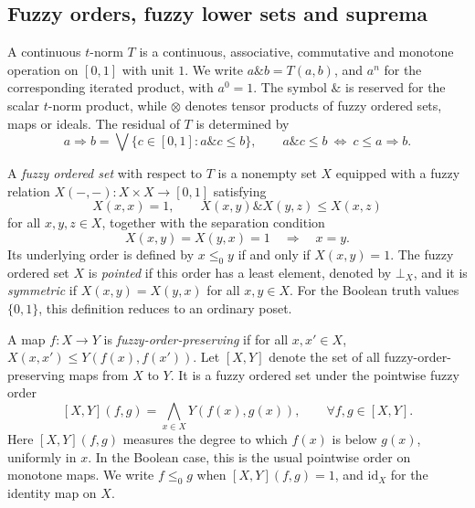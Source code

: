 \documentclass[preprint,3p,times]{elsarticle}
\theoremstyle{definition}
\theoremstyle{remark}
\newcommand{\id}{\mathrm{id}}
\newcommand{\tn}{\mathbin{\&}}
\numberwithin{equation}{section}
\begin{document}
\subsection{Fuzzy orders, fuzzy lower sets and suprema}
A continuous \(t\)-norm \(T\) is a continuous, associative, commutative and monotone operation on \([0,1]\) with unit \(1\). We write \(a\tn b=T(a,b)\), and \(a^n\) for the corresponding iterated product, with \(a^0=1\). The symbol \(\tn\) is reserved for the scalar \(t\)-norm product, while \(\otimes\) denotes tensor products of fuzzy ordered sets, maps or ideals. The residual of \(T\) is determined by
\[
 a\Rightarrow b=\bigvee\{c\in[0,1]:a\tn c\leq b\},
 \qquad
 a\tn c\leq b\ \Longleftrightarrow\ c\leq a\Rightarrow b.
\]

A \emph{fuzzy ordered set} with respect to \(T\) \cite[Section~2]{LaiZhangZhang2020} is a nonempty set \(X\) equipped with a fuzzy relation \(X(-,-)\colon X\times X\to[0,1]\) satisfying
\[
 X(x,x)=1,
 \qquad
 X(x,y)\tn X(y,z)\leq X(x,z)
\]
for all \(x,y,z\in X\), together with the separation condition
\[
 X(x,y)=X(y,x)=1\quad\Longrightarrow\quad x=y.
\]
Its underlying order is defined by \(x\leq_0y\) if and only if \(X(x,y)=1\). The fuzzy ordered set \(X\) is \emph{pointed} if this order has a least element, denoted by \(\bot_X\), and it is \emph{symmetric} if \(X(x,y)=X(y,x)\) for all \(x,y\in X\). For the Boolean truth values \(\{0,1\}\), this definition reduces to an ordinary poset.

A map \(f\colon X\to Y\) is \emph{fuzzy-order-preserving} if for all \(x,x'\in X\),
\(
 X(x,x')\leq Y(f(x),f(x'))
\).
Let \([X,Y]\) denote the set of all fuzzy-order-preserving maps from \(X\) to \(Y\). It is a fuzzy ordered set under the pointwise fuzzy order \cite[Section~14]{Zhang2024}
\begin{equation}\label{eq:pointwise-hom}
 [X,Y](f,g)=\bigwedge_{x\in X}Y(f(x),g(x)),
 \qquad \forall f,g\in[X,Y].
\end{equation}
Here \([X,Y](f,g)\) measures the degree to which \(f(x)\) is below \(g(x)\), uniformly in \(x\). In the Boolean case, this is the usual pointwise order on monotone maps. We write \(f\leq_0g\) when \([X,Y](f,g)=1\), and \(\id_X\) for the identity map on \(X\).
\end{document}
